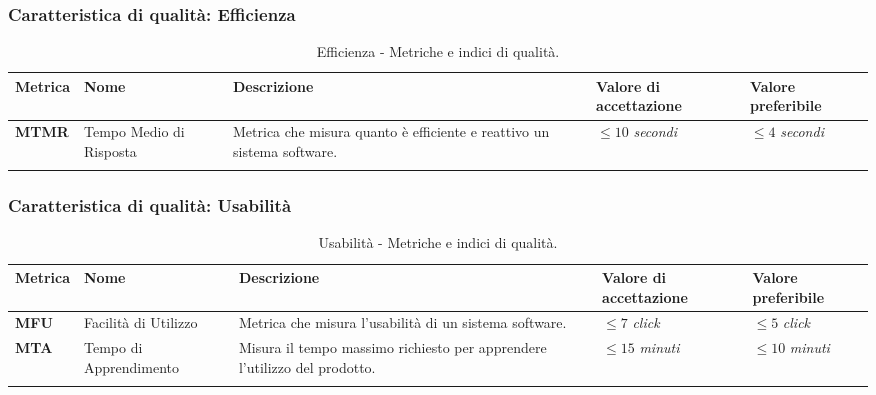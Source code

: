\subsubsection{Caratteristica di qualità: Efficienza}
\hspace{1pt}
        \begin{longtable}{|C{1.5cm}|L{3cm}|L{4cm}|L{2.5cm}|L{2.5cm}|}
                    \hline
                    \textbf{Metrica} & \textbf{Nome} & \textbf{Descrizione} & \textbf{Valore di accettazione} & \textbf{Valore preferibile} \\
                    \hline
                    \textbf{MTMR} & Tempo Medio di Risposta & Metrica che misura quanto è efficiente e reattivo un sistema software. & $\leq 10$ \textit{secondi}  & $\leq 4$ \textit{secondi} \\

                    \hline
                    \caption{Efficienza - Metriche e indici di qualità.}
        \label{tab:metriche_efficienza_testo}
    \end{longtable}

\subsubsection{Caratteristica di qualità: Usabilità}
\hspace{1pt}
            \begin{longtable}{|C{1.5cm}|L{3cm}|L{4cm}|L{2.5cm}|L{2.5cm}|}
                        \hline
                        \textbf{Metrica} & \textbf{Nome} & \textbf{Descrizione} & \textbf{Valore di accettazione} & \textbf{Valore preferibile} \\
                        \hline
                        \textbf{MFU} & Facilità di Utilizzo & Metrica che misura l'usabilità di un sistema software. & $\leq 7$ \textit{click}  & $\leq 5$ \textit{click} \\
                        \hline
                        \textbf{MTA} & Tempo di Apprendimento & Misura il tempo massimo richiesto per apprendere l'utilizzo del prodotto. & $\leq 15$ \textit{minuti}  & $\leq 10$ \textit{minuti} \\
                        \hline
                        \caption{Usabilità - Metriche e indici di qualità.}
            \label{tab:metriche_usabilità_testo}
        \end{longtable}


